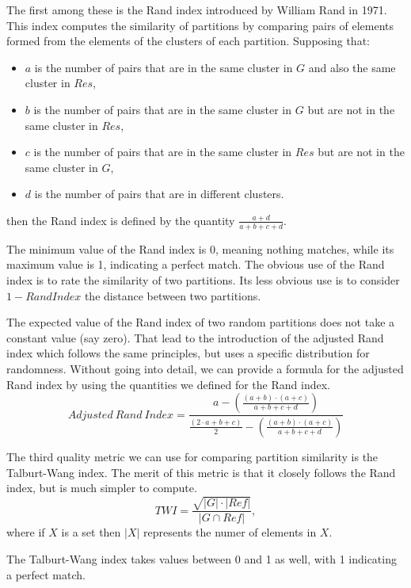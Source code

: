 \documentclass[11pt]{article}
\begin{document}
    The first among these is the Rand index introduced by William Rand in
    1971\cite{rand1971}.
    This index computes the similarity of partitions by comparing pairs of
    elements formed from the elements of the clusters of each partition.
    Supposing that:
    \begin{itemize}
        \item $a$ is the number of pairs that are in the same cluster in $G$ and
        also the same cluster in $Res$,
        \item $b$ is the number of pairs that are in the same cluster in $G$ but
        are not in the same cluster in $Res$,
        \item $c$ is the number of pairs that are in the same cluster in $Res$
        but are not in the same cluster in $G$,
        \item $d$ is the number of pairs that are in different clusters.
    \end{itemize}
    then the Rand index is defined by the quantity
    $\frac{a+d}{a+b+c+d}$\cite{adjrand2001}.

    The minimum value of the Rand index is 0, meaning nothing matches, while its
    maximum value is 1, indicating a perfect match.
    The obvious use of the Rand index is to rate the similarity of two
    partitions.
    Its less obvious use is to consider $1 - Rand Index$ the distance between
    two partitions.

    The expected value of the Rand index of two random partitions does not take
    a constant value (say zero)\cite{adjrand2001}.
    That lead to the introduction of the adjusted Rand index which follows the
    same principles, but uses a specific distribution for
    randomness\cite{adjrand1985}.
    Without going into detail, we can provide a formula for the adjusted Rand
    index by using the quantities we defined for the Rand index\cite{Tal11}.
    \[
        Adjusted~Rand~Index = \frac{
            a - (\frac{(a+b)\cdot(a+c)}{a+b+c+d})
        }{
            \frac{(2\cdot a+b+c)}{2}-(\frac{(a+b)\cdot(a+c)}{a+b+c+d})
        }
    \]

    The third quality metric we can use for comparing partition similarity is
    the Talburt-Wang index.
    The merit of this metric is that it closely follows the Rand index, but is
    much simpler to compute\cite{Tal11}.
    \[
        TWI = \frac{\sqrt{|G|\cdot|Ref|}}{|G \cap Ref|},
    \]
    where if $X$ is a set then $|X|$ represents the numer of elements in $X$.

    The Talburt-Wang index takes values between 0 and 1 as well, with 1
    indicating a perfect match.
\end{document}
